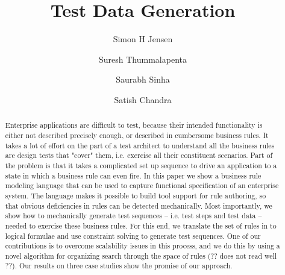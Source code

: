 \documentclass{sig-alternate}
\begin{document}
\newcommand{\ie}{\textit{i.e.,} }
\newcommand{\eg}{\textit{e.g.,} }
\newcommand{\subject}[1]{\texttt{\small #1}}
\newcommand{\rules}{{\mathcal R}}
\newcommand{\tests}{{\mathcal T}}
\newcommand{\elemexists}{\mt{exists}}
\newcommand{\elemenabled}{\mt{enabled}}
\newcommand{\elemexplored}{\mt{explored}}
\newcommand{\note}[1]{{\color{red}$[$ \bf #1 $]$}}
\newcommand{\lang}[1]{\texttt{\scriptsize #1}}


\title{Test Data Generation}

\author{Simon H Jensen \and Suresh Thummalapenta \and Saurabh Sinha \and Satish Chandra}

\maketitle

\begin{abstract}
Enterprise applications are difficult to test, because their intended functionality is either 
not described precisely enough, or described in cumbersome business rules. It takes a lot of 
effort on the part of a test architect to understand all the business rules are design tests 
that "cover" them, i.e. exercise all their constituent scenarios. Part of the problem is that 
it takes a complicated set up sequence to drive an application to a state in which a business 
rule can even fire.  In this paper we show a business rule modeling language that can be used 
to capture functional specification of an enterprise system. The language makes it possible to 
build tool support for rule authoring, so that obvious deficiencies in rules can be detected 
mechanically. Most importantly, we show how to mechanically generate test sequences -- i.e. 
test steps and test data -- needed to exercise these business rules. For this end, we translate 
the set of rules in to logical formulae and use constraint solving to generate test sequences. 
One of our contributions is to overcome scalability issues in this process, and we do this by 
using a novel algorithm for organizing search through the space of rules (?? does not read well ??). 
Our results on three case studies show the promise of our approach.
\end{abstract}









\end{document}
